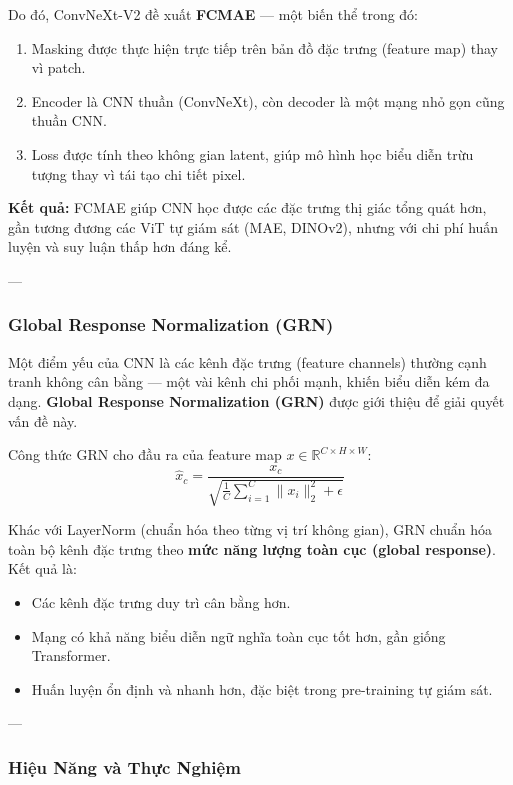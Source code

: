 Do đó, ConvNeXt-V2 đề xuất \textbf{FCMAE} — một biến thể trong đó:
\begin{enumerate}
	\item Masking được thực hiện trực tiếp trên bản đồ đặc trưng (feature map) thay vì patch.
	\item Encoder là CNN thuần (ConvNeXt), còn decoder là một mạng nhỏ gọn cũng thuần CNN.
	\item Loss được tính theo không gian latent, giúp mô hình học biểu diễn trừu tượng thay vì tái tạo chi tiết pixel.
\end{enumerate}

\textbf{Kết quả:} FCMAE giúp CNN học được các đặc trưng thị giác tổng quát hơn, gần tương đương các ViT tự giám sát (MAE, DINOv2), nhưng với chi phí huấn luyện và suy luận thấp hơn đáng kể.

---

\subsubsection{Global Response Normalization (GRN)}
\label{subsubsec:grn}

Một điểm yếu của CNN là các kênh đặc trưng (feature channels) thường cạnh tranh không cân bằng — một vài kênh chi phối mạnh, khiến biểu diễn kém đa dạng.  
\textbf{Global Response Normalization (GRN)} được giới thiệu để giải quyết vấn đề này.

Công thức GRN cho đầu ra của feature map $x \in \mathbb{R}^{C \times H \times W}$:
\[
\hat{x}_c = \frac{x_c}{\sqrt{\frac{1}{C} \sum_{i=1}^{C} \|x_i\|_2^2 + \epsilon}}
\]

Khác với LayerNorm (chuẩn hóa theo từng vị trí không gian), GRN chuẩn hóa toàn bộ kênh đặc trưng theo \textbf{mức năng lượng toàn cục (global response)}.  
Kết quả là:
\begin{itemize}
	\item Các kênh đặc trưng duy trì cân bằng hơn.
	\item Mạng có khả năng biểu diễn ngữ nghĩa toàn cục tốt hơn, gần giống Transformer.
	\item Huấn luyện ổn định và nhanh hơn, đặc biệt trong pre-training tự giám sát.
\end{itemize}

---

\subsubsection{Hiệu Năng và Thực Nghiệm}
\label{subsubsec:convnext_v2_results}

